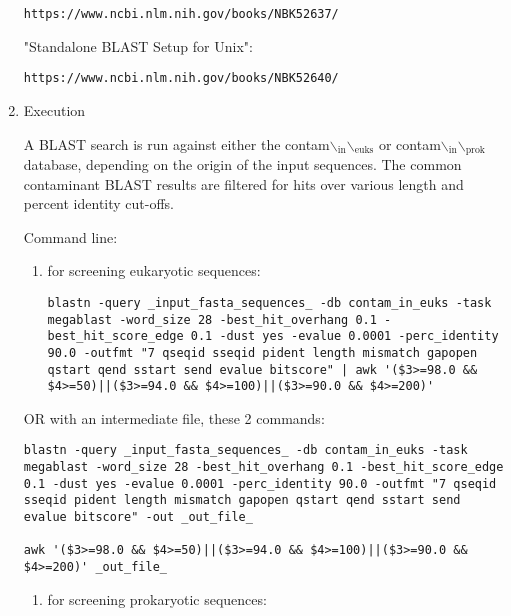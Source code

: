 \documentclass[11pt]{article}
\begin{document}
\begin{enumerate}
\begin{verbatim}
https://www.ncbi.nlm.nih.gov/books/NBK52637/
\end{verbatim}

"Standalone BLAST Setup for Unix":

\begin{verbatim}
https://www.ncbi.nlm.nih.gov/books/NBK52640/
\end{verbatim}

\item Execution
\label{sec:orgbdbb10d}


A BLAST search is run against either the contam$\backslash$\(_{\text{in}}\)$\backslash$\(_{\text{euks}}\) or
contam$\backslash$\(_{\text{in}}\)$\backslash$\(_{\text{prok}}\) database, depending on the origin of the input
sequences. The common contaminant BLAST results are filtered for hits
over various length and percent identity cut-offs.

Command line:

\begin{enumerate}
\item for screening eukaryotic sequences:

\begin{verbatim}
blastn -query _input_fasta_sequences_ -db contam_in_euks -task megablast -word_size 28 -best_hit_overhang 0.1 -best_hit_score_edge 0.1 -dust yes -evalue 0.0001 -perc_identity 90.0 -outfmt "7 qseqid sseqid pident length mismatch gapopen qstart qend sstart send evalue bitscore" | awk '($3>=98.0 && $4>=50)||($3>=94.0 && $4>=100)||($3>=90.0 && $4>=200)'
\end{verbatim}
\end{enumerate}

OR with an intermediate file, these 2 commands:

\begin{verbatim}
blastn -query _input_fasta_sequences_ -db contam_in_euks -task megablast -word_size 28 -best_hit_overhang 0.1 -best_hit_score_edge 0.1 -dust yes -evalue 0.0001 -perc_identity 90.0 -outfmt "7 qseqid sseqid pident length mismatch gapopen qstart qend sstart send evalue bitscore" -out _out_file_

awk '($3>=98.0 && $4>=50)||($3>=94.0 && $4>=100)||($3>=90.0 && $4>=200)' _out_file_
\end{verbatim}

\begin{enumerate}
\item for screening prokaryotic sequences:


\end{enumerate}
\end{enumerate}
\end{document}
